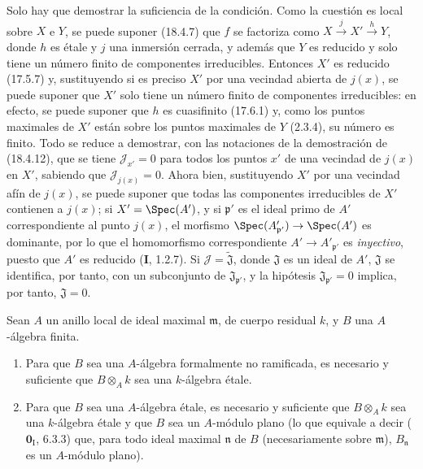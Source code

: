 Solo hay que demostrar la suficiencia de la condición. Como la cuestión es local sobre $X$ e $Y$, se puede suponer (18.4.7) que $f$ se factoriza como $X\xrightarrow{j}X'\xrightarrow{h}Y$, donde $h$ es étale y $j$ una inmersión cerrada, y además que $Y$ es reducido y solo tiene un número finito de componentes irreducibles. Entonces $X'$ es reducido (17.5.7) y, sustituyendo si es preciso $X'$ por una vecindad abierta de $j(x)$, se puede suponer que $X'$ solo tiene un número finito de componentes irreducibles: en efecto, se puede suponer que $h$ es cuasifinito (17.6.1) y, como los puntos maximales de $X'$ están sobre los puntos maximales de $Y$ (2.3.4), su número es finito. Todo se reduce a demostrar, con las notaciones de la demostración de (18.4.12), que se tiene $\mathscr J_{x'}=0$ para todos los puntos $x'$ de una vecindad de $j(x)$ en $X'$, sabiendo que $\mathscr J_{j(x)}=0$. Ahora bien, sustituyendo $X'$ por una vecindad afín de $j(x)$, se puede suponer que todas las componentes irreducibles de $X'$ contienen a $j(x)$; si $X'=\Spec(A')$, y si $\mathfrak p'$ es el ideal primo de $A'$ correspondiente al punto $j(x)$, el morfismo $\Spec(A'_{\mathfrak p'})\to\Spec(A')$ es dominante, por lo que el homomorfismo correspondiente $A'\to A'_{\mathfrak p'}$ es \emph{inyectivo}, puesto que $A'$ es reducido (\textbf I, 1.2.7). Si $\mathscr J=\widetilde{\mathfrak J}$, donde $\mathfrak J$ es un ideal de $A'$, $\mathfrak J$ se identifica, por tanto, con un subconjunto de $\mathfrak J_{\mathfrak p'}$, y la hipótesis $\mathfrak J_{\mathfrak p'}=0$ implica, por tanto, $\mathfrak J=0$.

\begin{corollary}[18.4.14]
\label{IV.18.4.14}
Sean $A$ un anillo local de ideal maximal $\mathfrak m$, de cuerpo residual $k$, y $B$ una $A$-álgebra finita.


\begin{enumerate}
  \item[\textup{(i)}] Para que $B$ sea una $A$-álgebra formalmente no ramificada, es necesario y suficiente que $B\otimes_A k$ sea una $k$-álgebra étale.
  \item[\textup{(ii)}] Para que $B$ sea una $A$-álgebra étale, es necesario y suficiente que $B\otimes_A k$ sea una $k$-álgebra étale y que $B$ sea un $A$-módulo plano \textup{(lo que equivale a decir ($\mathbf{0}_{\mathrm I}$, 6.3.3) que, para todo ideal maximal $\mathfrak n$ de $B$ (necesariamente sobre $\mathfrak m$), $B_{\mathfrak n}$ es un $A$-módulo plano).}
\end{enumerate}
\end{corollary}

